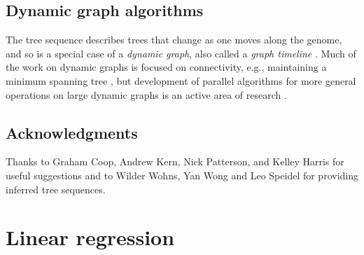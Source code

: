 \documentclass{article}
\begin{document}
\subsection*{Dynamic graph algorithms}

The tree sequence describes trees that change as one moves along the genome,
and so is a special case of a \emph{dynamic graph},
also called a \emph{graph timeline} \citep{lacki2013reachability}.
Much of the work on dynamic graphs is focused on connectivity,
e.g., maintaining a minimum spanning tree \citep{eppstein1994offline, eppstein1997sparsification, holm2001polylogarithmic},
but development of parallel algorithms for more general operations on large dynamic graphs
is an active area of research \citep[e.g.,][]{srinivasan2018sharedmemory}.



\subsection*{Acknowledgments}
Thanks to Graham Coop, Andrew Kern, Nick Patterson, and Kelley Harris for useful suggestions
and to Wilder Wohns, Yan Wong and Leo Speidel for providing inferred tree sequences.




\clearpage
\appendix
\setcounter{table}{0}
\renewcommand{\thetable}{S\arabic{table}}
\setcounter{figure}{0}
\renewcommand{\thefigure}{S\arabic{figure}}




\appendix

\section{Linear regression}
\label{apx:regression}
\end{document}
